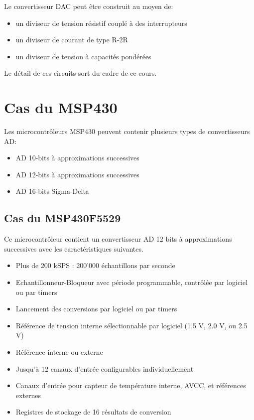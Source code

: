 Le convertisseur DAC peut être construit au moyen de:
\begin{itemize}[label=\textbullet,font=\small]
\item un diviseur de tension résistif couplé à des interrupteurs
\item un diviseur de courant de type R-2R
\item un diviseur de tension à capacités pondérées
\end{itemize}
Le détail de ces circuits sort du cadre de ce cours.

\section{Cas du MSP430}
Les microcontrôleurs MSP430 peuvent contenir plusieurs types de convertisseurs AD:
\begin{itemize}[label=\textbullet,font=\small]
\item AD 10-bits à approximations successives
\item AD 12-bits à approximations successives
\item AD 16-bits Sigma-Delta
\end{itemize}

\subsection{Cas du MSP430F5529}
Ce microcontrôleur contient un convertisseur AD 12 bits à approximations successives avec les caractéristiques suivantes.
\begin{itemize}[label=\textbullet,font=\small]
\item Plus de 200 kSPS : 200'000 échantillons par seconde
\item Echantillonneur-Bloqueur avec période programmable, contrôlée par logiciel ou par timers
\item Lancement des conversions par logiciel ou par timers
\item Référence de tension interne sélectionnable par logiciel (1.5 V, 2.0 V, ou 2.5 V)
\item Référence interne ou externe
\item Jusqu'à 12 canaux d'entrée configurables individuellement
\item Canaux d'entrée pour capteur de température interne, AVCC, et références externes
\item Registres de stockage de 16 résultats de conversion
\end{itemize}

